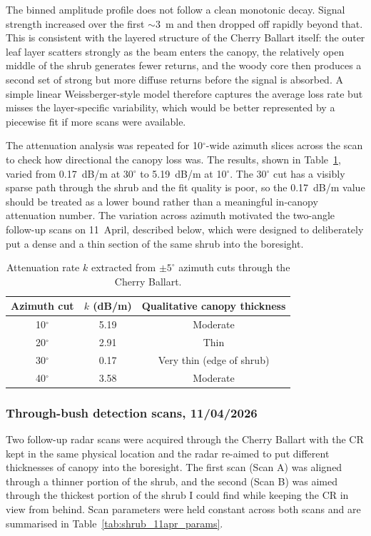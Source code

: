 The binned amplitude profile does not follow a clean monotonic decay. Signal strength increased over the first $\sim$3~m and then dropped off rapidly beyond that. This is consistent with the layered structure of the Cherry Ballart itself: the outer leaf layer scatters strongly as the beam enters the canopy, the relatively open middle of the shrub generates fewer returns, and the woody core then produces a second set of strong but more diffuse returns before the signal is absorbed. A simple linear Weissberger-style model therefore captures the average loss rate but misses the layer-specific variability, which would be better represented by a piecewise fit if more scans were available.

The attenuation analysis was repeated for 10$^\circ$-wide azimuth slices across the scan to check how directional the canopy loss was. The results, shown in Table~\ref{tab:ballart_multi_az}, varied from 0.17~dB/m at 30$^\circ$ to 5.19~dB/m at 10$^\circ$. The 30$^\circ$ cut has a visibly sparse path through the shrub and the fit quality is poor, so the 0.17~dB/m value should be treated as a lower bound rather than a meaningful in-canopy attenuation number. The variation across azimuth motivated the two-angle follow-up scans on 11~April, described below, which were designed to deliberately put a dense and a thin section of the same shrub into the boresight.

\begin{table}[H]
\centering
\caption{Attenuation rate $k$ extracted from $\pm 5^{\circ}$ azimuth cuts through the Cherry Ballart.}
\label{tab:ballart_multi_az}
\begin{tabular}{ccc}
\hline
\textbf{Azimuth cut} & \textbf{$k$ (dB/m)} & \textbf{Qualitative canopy thickness} \\
\hline
10$^\circ$ & 5.19 & Moderate \\
20$^\circ$ & 2.91 & Thin    \\
30$^\circ$ & 0.17 & Very thin (edge of shrub) \\
40$^\circ$ & 3.58 & Moderate \\
\hline
\end{tabular}
\end{table}

\subsubsection{Through-bush detection scans, 11/04/2026}

Two follow-up radar scans were acquired through the Cherry Ballart with the CR kept in the same physical location and the radar re-aimed to put different thicknesses of canopy into the boresight. The first scan (Scan A) was aligned through a thinner portion of the shrub, and the second (Scan B) was aimed through the thickest portion of the shrub I could find while keeping the CR in view from behind. Scan parameters were held constant across both scans and are summarised in Table~\ref{tab:shrub_11apr_params}.


